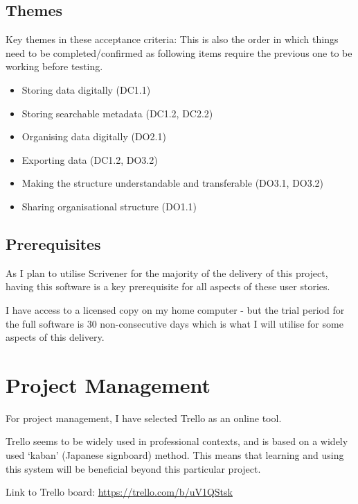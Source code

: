 \documentclass{article}
\begin{document}
\subsection{Themes} 

Key themes in these acceptance criteria:
This is also the order in which things need to be completed/confirmed as following items require the previous one to be working before testing.

\begin{itemize}
    \item Storing data digitally (DC1.1)
    \item Storing searchable metadata (DC1.2, DC2.2)
    \item Organising data digitally (DO2.1)
    \item Exporting data (DC1.2, DO3.2)
    \item Making the structure understandable and transferable (DO3.1, DO3.2)
    \item Sharing organisational structure (DO1.1)
\end{itemize}

\subsection{Prerequisites}


As I plan to utilise Scrivener for the majority of the delivery of this project, having this software is a key prerequisite for all aspects of these user stories. 

I have access to a licensed copy on my home computer - but the trial period for the full software is 30 non-consecutive days which is what I will utilise for some aspects of this delivery. 

\section{Project Management}

For project management, I have selected Trello as an online tool.

Trello seems to be widely used in professional contexts, and is based on a widely used `kaban' (Japanese signboard) method. This means that learning and using this system will be beneficial beyond this particular project.

Link to Trello board: \href{https://trello.com/b/uV1QStsk}{https://trello.com/b/uV1QStsk}
\end{document}
